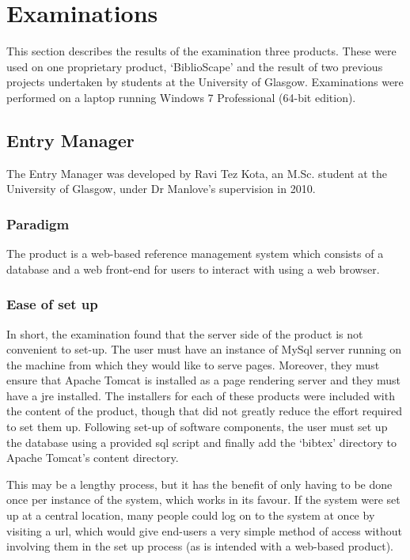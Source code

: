 \section{Examinations}
This section describes the results of the examination three products.  These were used on one proprietary product, `BiblioScape' and the result of two previous projects undertaken by students at the University of Glasgow.  Examinations were performed on a laptop running Windows 7 Professional (64-bit edition).

\subsection{\bibtex{} Entry Manager}
The \bibtex{} Entry Manager was developed by Ravi Tez Kota, an M.Sc. student at the University of Glasgow, under Dr Manlove's supervision in 2010.

\subsubsection{Paradigm}
The product is a web-based reference management system which consists of a database and a web front-end for users to interact with using a web browser.

\subsubsection{Ease of set up}
In short, the examination found that the server side of the product is not convenient to set-up.  The user must have an instance of MySql server running on the machine from which they would like to serve pages. Moreover, they must ensure that Apache Tomcat is installed as a page rendering server and they must have a \gls{jre} installed.  The installers for each of these products were included with the content of the product, though that did not greatly reduce the effort required to set them up.  Following set-up of software components, the user must set up the database using a provided \gls{sql} script and finally add the `bibtex' directory to Apache Tomcat's content directory.  

This may be a lengthy process, but it has the benefit of only having to be done once per instance of the system, which works in its favour. If the system were set up at a central location, many people could log on to the system at once by visiting a \gls{url}, which would give end-users a very simple method of access without involving them in the set up process (as is intended with a web-based product).

